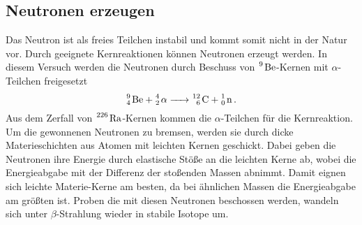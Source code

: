 \subsection{Neutronen erzeugen}
Das Neutron ist als freies Teilchen instabil und kommt somit nicht in der Natur vor. Durch geeignete Kernreaktionen können Neutronen erzeugt werden.
In diesem Versuch werden die Neutronen durch Beschuss von $\ce{^9 Be}$-Kernen mit $\alpha$-Teilchen freigesetzt
\begin{equation*}
    \ce{ ^9_4 Be + ^4_2 $\alpha$ -> ^{12}_6 C + ^1_0 n} \, .
\end{equation*}
Aus dem Zerfall von $\ce{^226 Ra}$-Kernen kommen die $\alpha$-Teilchen für die Kernreaktion. 
Um die gewonnenen Neutronen zu bremsen, werden sie durch dicke Materieschichten aus Atomen mit leichten Kernen geschickt.
Dabei geben die Neutronen ihre Energie durch elastische Stöße an die leichten Kerne ab, wobei die Energieabgabe mit der Differenz der stoßenden Massen abnimmt.
Damit eignen sich leichte Materie-Kerne am besten, da bei ähnlichen Massen die Energieabgabe am größten ist.
Proben die mit diesen Neutronen beschossen werden, wandeln sich unter $\beta$-Strahlung wieder in stabile Isotope um.
